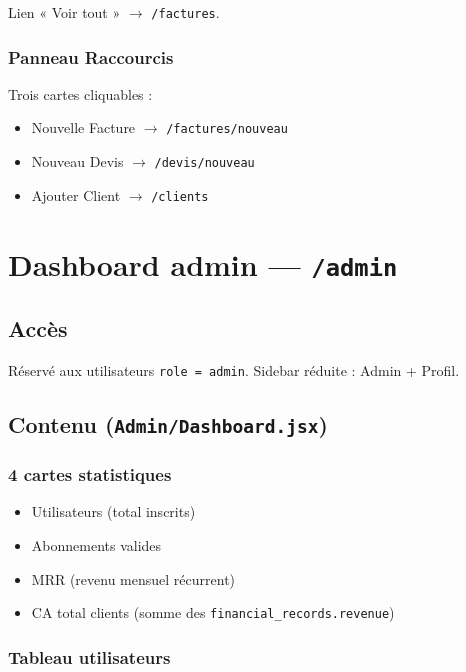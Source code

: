\documentclass[11pt,a4paper]{report}
\newcommand{\filepath}[1]{\texttt{\small #1}}
\newcommand{\route}[1]{\texttt{\small #1}}
\begin{document}
Lien « Voir tout » $\rightarrow$ \route{/factures}.

\subsection{Panneau Raccourcis}

Trois cartes cliquables :
\begin{itemize}[leftmargin=1.5em]
    \item Nouvelle Facture $\rightarrow$ \route{/factures/nouveau}
    \item Nouveau Devis $\rightarrow$ \route{/devis/nouveau}
    \item Ajouter Client $\rightarrow$ \route{/clients}
\end{itemize}

\chapter{Dashboard admin — \route{/admin}}

\section{Accès}

Réservé aux utilisateurs \texttt{role = admin}. Sidebar réduite : Admin + Profil.

\section{Contenu (\filepath{Admin/Dashboard.jsx})}

\subsection{4 cartes statistiques}
\begin{itemize}[leftmargin=1.5em]
    \item Utilisateurs (total inscrits)
    \item Abonnements valides
    \item MRR (revenu mensuel récurrent)
    \item CA total clients (somme des \texttt{financial\_records.revenue})
\end{itemize}

\subsection{Tableau utilisateurs}
\end{document}
